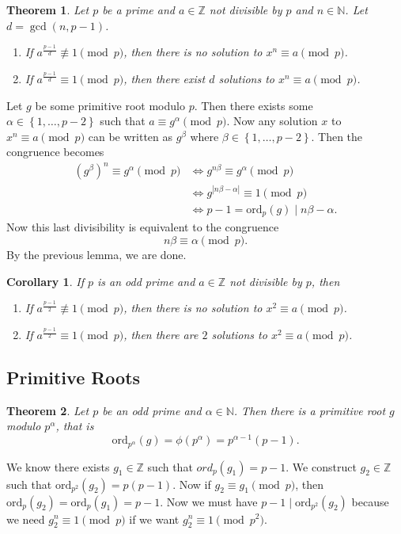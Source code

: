 \documentclass[11pt]{article}
\newtheorem{thm}{Theorem}[section]
\newtheorem{cor}{Corollary}[thm]
\theoremstyle{definition}
\newcommand{\ord}[0]{\text{ord}}
\newcommand{\set}[1]{\left\{ #1 \right\}}
\newcommand{\rng}[2]{#1,\dots,#2}
\newcommand{\abs}[1]{\left\lvert#1\right\rvert} %
\newcommand{\ZZ}{\mathbb{Z}}
\newcommand{\NN}{\mathbb{N}}
\begin{document}
\begin{thm}
	Let $p$ be a prime and $a\in\ZZ$ not divisible by $p$ and $n\in\NN$. Let $d = \gcd(n,p-1)$. 
	\begin{enumerate}
		\item[(a)] If $a^{\frac{p-1}{d}} \not\equiv 1 \pmod{p}$, then there is no solution to $x^n \equiv a \pmod{p}$. 
		\item[(b)] If $a^{\frac{p-1}{d}} \equiv 1 \pmod{p}$, then there exist $d$ solutions to $x^n \equiv a \pmod{p}$. 
	\end{enumerate}
\end{thm}
\proof
	Let $g$ be some primitive root modulo $p$.
	Then there exists some $\alpha\in\set{\rng{1}{p-2}}$ such that $a \equiv g^\alpha \pmod{p}$. 
	Now any solution $x$ to $x^n\equiv a \pmod{p}$ can be written as $g^\beta$ where $\beta\in\set{\rng{1}{p-2}}$. 
	Then the congruence becomes
	\begin{align*}
		(g^\beta)^n \equiv g^\alpha \pmod{p} &\iff g^{n\beta} \equiv g^\alpha \pmod{p} \\
		&\iff g^{\abs{n\beta-\alpha}} \equiv 1 \pmod{p} \\
		&\iff p-1 = \ord_p(g) \mid n\beta - \alpha.
	\end{align*}
	Now this last divisibility is equivalent to the congruence
	$$ n\beta \equiv \alpha \pmod{p} . $$
	By the previous lemma, we are done.
\qedhere

\begin{cor} 
	If $p$ is an odd prime and $a\in\ZZ$ not divisible by $p$, then 
	\begin{enumerate} 
		\item[(a)] If $a^{\frac{p-1}{2}} \not\equiv 1 \pmod{p}$, then there is no solution to $x^2 \equiv a \pmod{p}$. 
		\item[(b)] If $a^{\frac{p-1}{2}} \equiv 1 \pmod{p}$, then there are $2$ solutions to $x^2 \equiv a \pmod{p}$. 
	\end{enumerate}
\end{cor}

\subsection{Primitive Roots}
\begin{thm}
	Let $p$ be an odd prime and $\alpha\in\NN$. Then there is a primitive root $g$ modulo $p^{\alpha}$, that is 
	$$ \ord_{p^\alpha}(g) = \phi(p^{\alpha}) = p^{\alpha-1}(p-1). $$
\end{thm}
\proof 
	We know there exists $g_1\in\ZZ$ such that $ord_p(g_1) = p-1$. 
	We construct $g_2\in\ZZ$ such that $\ord_{p^2}(g_2) = p(p-1)$. 
	Now if $g_2 \equiv g_1 \pmod{p}$, then $\ord_p(g_2) = \ord_p(g_1) = p-1$. 
	Now we must have $p-1 \mid \ord_{p^2}(g_2)$ because we need $g_2^n \equiv 1 \pmod{p}$ if we want $g_2^n \equiv 1 \pmod{p^2}$. 
	
\end{document}
